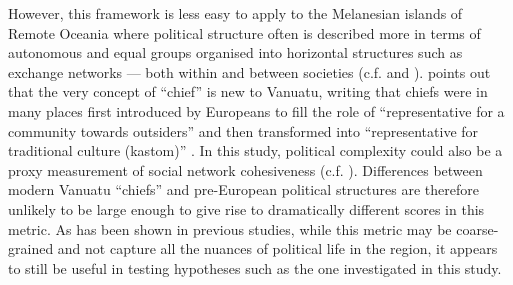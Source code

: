 \documentclass[12pt,letterpaper]{article}
\begin{document}
However, this framework is less easy to apply to the Melanesian islands of Remote Oceania where political structure often is described more in terms of autonomous and equal groups organised into horizontal structures such as exchange networks --- both within and between societies (c.f. \citet{bonnemaison1996graded} and \citet{huffman1996trading}). \citet{bolton1998chief} points out that the very concept of ``chief'' is new to Vanuatu, writing that chiefs were in many places first introduced by Europeans to fill the role of ``representative for a community towards outsiders'' and then transformed into ``representative for traditional culture (kastom)'' \citep[185]{bolton1998chief}. In this study, political complexity could also be a proxy measurement of social network cohesiveness (c.f. \citet{grace_1992_aberrant}). Differences between modern Vanuatu ``chiefs'' and pre-European political structures are therefore unlikely to be large enough to give rise to dramatically different scores in this metric. As has been shown in previous studies, while this metric may be coarse-grained and not capture all the nuances of political life in the region, it appears to still be useful in testing hypotheses such as the one investigated in this study.



\end{document}
